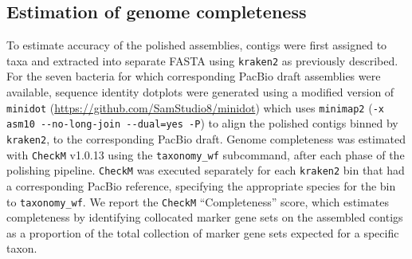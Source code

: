 \documentclass[a4paper,num-refs]{oup-contemporary}
\begin{document}
\subsection{Estimation of genome completeness}
To estimate accuracy of the polished assemblies, contigs were first assigned to taxa and extracted into separate FASTA using \texttt{kraken2} as previously described.
For the seven bacteria for which corresponding PacBio draft assemblies were available, sequence identity dotplots were generated using a modified version of \texttt{minidot} (\url{https://github.com/SamStudio8/minidot}) which uses \texttt{minimap2} (\texttt{-x asm10 -{}-no-long-join -{}-dual=yes -P}) to align the polished contigs binned by \texttt{kraken2}, to the corresponding PacBio draft.
Genome completeness was estimated with \texttt{CheckM} v1.0.13 \cite{parks2015checkm} using the \texttt{taxonomy\_wf} subcommand, after each phase of the polishing pipeline.
\texttt{CheckM} was executed separately for each \texttt{kraken2} bin that had a corresponding PacBio reference, specifying the appropriate species for the bin to \texttt{taxonomy\_wf}.
We report the \texttt{CheckM} ``Completeness'' score, which estimates completeness by identifying collocated marker gene sets on the assembled contigs as a proportion of the total
collection of marker gene sets expected for a specific taxon.
\end{document}
